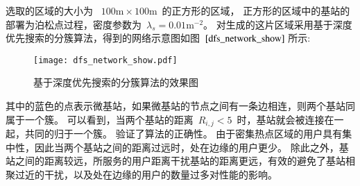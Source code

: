 选取的区域的大小为 ~$100\mathrm{m} \times 100 \mathrm{m}$~的正方形的区域，
正方形的区域中的基站的部署为泊松点过程，密度参数为~$\lambda_s=0.01 \mathrm{m}^{-2}$。
对生成的这片区域采用基于深度优先搜索的分簇算法，得到的网络示意图如图~$\ref{dfs_network_show}~$所示:

\begin{figure}[htbp]
\centering
\texttt{[image: dfs\_network\_show.pdf]}
\caption{基于深度优先搜索的分簇算法的效果图}\vspace{-0.5em}
\label{dfs_network_show}
\end{figure}

其中的蓝色的点表示微基站，如果微基站的节点之间有一条边相连，则两个基站同属于一个簇。
可以看到，当两个基站的距离~$R_{i,j} < 5$~时，基站就会被连接在一起，共同的归于一个簇。
验证了算法的正确性。
由于密集热点区域的用户具有集中性，因此当两个基站之间的距离过远时，处在边缘的用户更少。
除此之外，基站之间的距离较远，所服务的用户距离干扰基站的距离更远，有效的避免了基站相聚过近的干扰，以及处在边缘的用户的数量过多对性能的影响。
